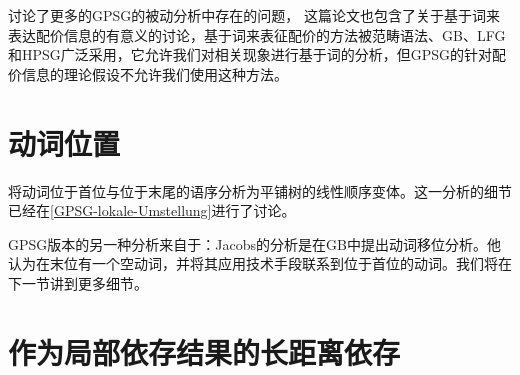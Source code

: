 \citet[--396]{Jacobson87b}讨论了更多的GPSG的被动分析中存在的问题，
这篇论文也包含了关于基于词来表达配价信息的有意义的讨论，基于词来表征配价的方法被范畴语法、GB、LFG和HPSG广泛采用，它允许我们对相关现象进行基于词的分析，但GPSG的针对配价信息的理论假设不允许我们使用这种方法。

\section{动词位置}
\label{Abschnitt-Verbstellung-GPSG}

\mbox{}\citet{Uszkoreit87a}将动词位于首位与位于末尾的语序分析为平铺树的线性顺序变体。这一分析的细节已经在\ref{GPSG-lokale-Umstellung}进行了讨论。

GPSG版本的另一种分析来自于\citet[]{Jacobs86a}：Jacobs的分析是在GB中提出动词移位分析。他认为在末位有一个空动词，并将其应用技术手段联系到位于首位的动词。我们将在下一节讲到更多细节。

\section{作为局部依存结果的长距离依存}
\label{Abschnitt-GPSG-Fernabhaengigkeiten}\label{sec-nld-gpsg}

